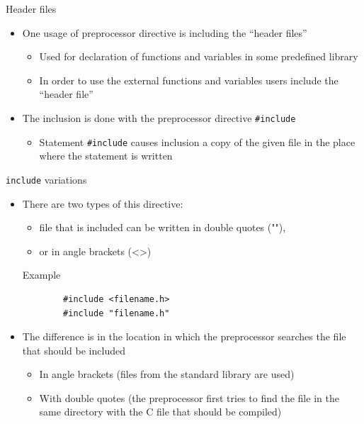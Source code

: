 \begin{frame}{Header files}
\begin{itemize}
    \item One usage of preprocessor directive is including the ``header files''
    \begin{itemize}
        \item Used for declaration of functions and variables in some predefined
        library
        \item In order to use the external functions and variables users include the
        ``header file''
    \end{itemize}
    \item The inclusion is done with the preprocessor directive 
    \texttt{\#include}
    \begin{itemize}
        \item Statement \texttt{\#include} causes inclusion a copy of the given file
        in the place where the statement is written
    \end{itemize}
\end{itemize}
\end{frame}

\begin{frame}[fragile]{\texttt{include} variations}
\begin{itemize}
    \item There are two types of this directive:
    \begin{itemize}
        \item file that is included can be written in double quotes (""),
        \item or in angle brackets (<>)
    \end{itemize}
    \begin{exampleblock}{Example}
        \begin{verbatim}
        #include <filename.h>
        #include "filename.h"
        \end{verbatim}
    \end{exampleblock}
    \item The difference is in the location in which the preprocessor
    searches the file that should be included
    \begin{itemize}
        \item In angle brackets (files from the standard library are used)
        \item With double quotes (the preprocessor first tries to find
        the file in the same directory with the C file that should be
        compiled)
    \end{itemize}
\end{itemize}

\end{frame}


